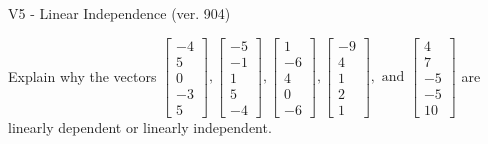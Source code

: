 \begin{exercise}
  \begin{exerciseTitle}V5 - Linear Independence (ver. 904)\end{exerciseTitle}
  \begin{exerciseStatement}
    Explain why the vectors \(\left[\begin{array}{r}
-4 \\
5 \\
0 \\
-3 \\
5
\end{array}\right] , \left[\begin{array}{r}
-5 \\
-1 \\
1 \\
5 \\
-4
\end{array}\right] , \left[\begin{array}{r}
1 \\
-6 \\
4 \\
0 \\
-6
\end{array}\right] , \left[\begin{array}{r}
-9 \\
4 \\
1 \\
2 \\
1
\end{array}\right] , \text{ and } \left[\begin{array}{r}
4 \\
7 \\
-5 \\
-5 \\
10
\end{array}\right]\) are linearly dependent or linearly independent.	



\end{exerciseStatement}
\end{exercise}
